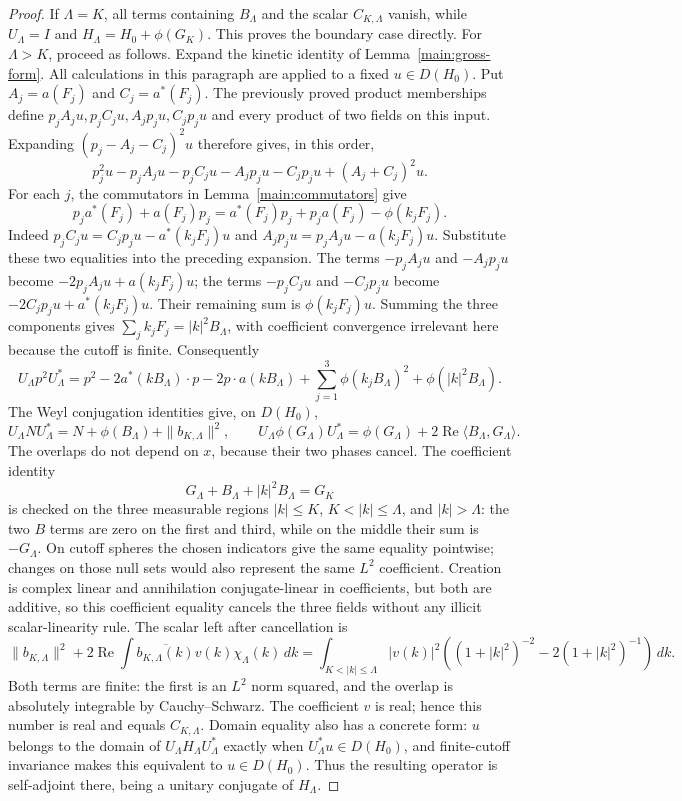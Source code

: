 \documentclass[11pt,a4paper]{article}
\theoremstyle{definition}
\theoremstyle{remark}
\begin{document}
\begin{proof}
If $\Lambda=K$, all terms containing $B_\Lambda$ and the scalar
$C_{K,\Lambda}$ vanish, while $U_\Lambda=I$ and
$H_\Lambda=H_0+\phi(G_K)$. This proves the boundary case directly.
For $\Lambda>K$, proceed as follows.
Expand the kinetic identity of Lemma~\ref{main:gross-form}.
All calculations in this paragraph are applied to a fixed
$u\in D(H_0)$. Put $A_j=a(F_j)$ and $C_j=a^*(F_j)$.
The previously proved product memberships define
$p_jA_ju,p_jC_ju,A_jp_ju,C_jp_ju$ and every product of two
fields on this input. Expanding
$(p_j-A_j-C_j)^2u$ therefore gives, in this order,
\[
 p_j^2u-p_jA_ju-p_jC_ju-A_jp_ju-C_jp_ju
                         +(A_j+C_j)^2u.
\]
For each $j$, the commutators in Lemma~\ref{main:commutators} give
\[
 p_ja^*(F_j)+a(F_j)p_j
 =a^*(F_j)p_j+p_ja(F_j)-\phi(k_jF_j).
\]
Indeed $p_jC_ju=C_jp_ju-a^*(k_jF_j)u$ and
$A_jp_ju=p_jA_ju-a(k_jF_j)u$. Substitute these two equalities
into the preceding expansion. The terms $-p_jA_ju$ and
$-A_jp_ju$ become $-2p_jA_ju+a(k_jF_j)u$; the terms
$-p_jC_ju$ and $-C_jp_ju$ become
$-2C_jp_ju+a^*(k_jF_j)u$. Their remaining sum is
$\phi(k_jF_j)u$. Summing the three components gives
$\sum_jk_jF_j=|k|^2B_\Lambda$, with coefficient convergence
irrelevant here because the cutoff is finite.
Consequently
\[
 U_\Lambda p^2U_\Lambda^*
 =p^2-2a^*(kB_\Lambda)\cdot p-2p\cdot a(kB_\Lambda)
       +\sum_{j=1}^3\phi(k_jB_\Lambda)^2+\phi(|k|^2B_\Lambda).
\]
The Weyl conjugation identities give, on $D(H_0)$,
\[
 U_\Lambda NU_\Lambda^*=N+\phi(B_\Lambda)+\|b_{K,\Lambda}\|^2,
\qquad
 U_\Lambda\phi(G_\Lambda)U_\Lambda^*
       =\phi(G_\Lambda)+2\operatorname{Re}\langle B_\Lambda,G_\Lambda\rangle.
\]
The overlaps do not depend on $x$, because their two phases cancel.
The coefficient identity
\[
 G_\Lambda+B_\Lambda+|k|^2B_\Lambda=G_K
\]
is checked on the three measurable regions $|k|\leq K$,
$K<|k|\leq\Lambda$, and $|k|>\Lambda$: the two $B$ terms
are zero on the first and third, while on the middle their sum
is $-G_\Lambda$. On cutoff spheres the chosen indicators give
the same equality pointwise; changes on those null sets would
also represent the same $L^2$ coefficient. Creation is complex
linear and annihilation conjugate-linear in coefficients, but
both are additive, so this coefficient equality cancels the
three fields without any illicit scalar-linearity rule.
The scalar left after cancellation is
\[
 \|b_{K,\Lambda}\|^2
       +2\operatorname{Re}\int\overline{b_{K,\Lambda}(k)}
                                  v(k)\chi_\Lambda(k)\,dk
 =\int_{K<|k|\leq\Lambda}|v(k)|^2
       \left((1+|k|^2)^{-2}-2(1+|k|^2)^{-1}\right)\,dk.
\]
Both terms are finite: the first is an $L^2$ norm squared, and
the overlap is absolutely integrable by Cauchy--Schwarz. The
coefficient $v$ is real; hence this number is real and equals
$C_{K,\Lambda}$. Domain equality also has a concrete form:
$u$ belongs to the domain of $U_\Lambda H_\Lambda U_\Lambda^*$
exactly when $U_\Lambda^*u\in D(H_0)$, and finite-cutoff
invariance makes this equivalent to $u\in D(H_0)$. Thus the
resulting operator is self-adjoint there, being a unitary conjugate of
$H_\Lambda$.
\end{proof}
\end{document}
